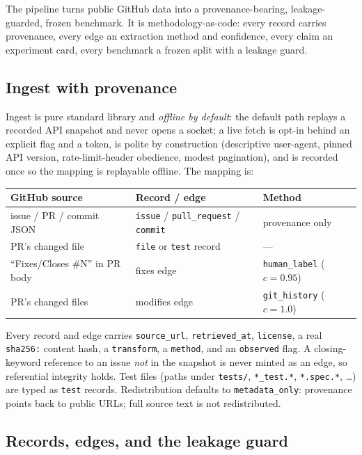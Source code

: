 \documentclass[11pt]{article}
\newcommand{\code}[1]{\texttt{#1}}
\newcommand{\rel}[1]{\textsf{#1}}
\begin{document}
The pipeline turns public GitHub data into a provenance-bearing, leakage-guarded,
frozen benchmark. It is methodology-as-code: every record carries provenance, every
edge an extraction method and confidence, every claim an experiment card, every
benchmark a frozen split with a leakage guard.

\subsection{Ingest with provenance}

Ingest is pure standard library and \emph{offline by default}: the default path
replays a recorded API snapshot and never opens a socket; a live fetch is opt-in
behind an explicit flag and a token, is polite by construction (descriptive
user-agent, pinned API version, rate-limit-header obedience, modest pagination),
and is recorded once so the mapping is replayable offline. The mapping is:
\begin{center}
\begin{tabular}{lll}
\toprule
GitHub source & Record / edge & Method \\
\midrule
issue / PR / commit JSON & \code{issue} / \code{pull\_request} / \code{commit} & provenance only \\
PR's changed file & \code{file} or \code{test} record & --- \\
``Fixes/Closes \#N'' in PR body & \rel{fixes} edge & \code{human\_label} ($c{=}0.95$) \\
PR's changed files & \rel{modifies} edge & \code{git\_history} ($c{=}1.0$) \\
\bottomrule
\end{tabular}
\end{center}
Every record and edge carries \code{source\_url}, \code{retrieved\_at},
\code{license}, a real \code{sha256:} content hash, a \code{transform}, a
\code{method}, and an \code{observed} flag. A closing-keyword reference to an issue
\emph{not} in the snapshot is never minted as an edge, so referential integrity
holds. Test files (paths under \code{tests/}, \code{*\_test.*}, \code{*.spec.*},
\dots) are typed as \code{test} records. Redistribution defaults to
\code{metadata\_only}: provenance points back to public URLs; full source text is
not redistributed.

\subsection{Records, edges, and the leakage guard}
\end{document}
